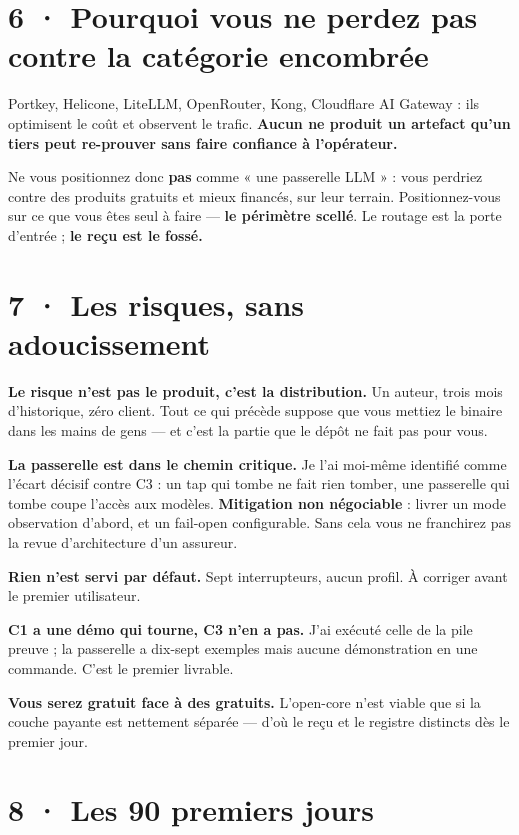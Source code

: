 \documentclass[10pt]{article}
\begin{document}
\section{6 · Pourquoi vous ne perdez pas contre la catégorie encombrée}

Portkey, Helicone, LiteLLM, OpenRouter, Kong, Cloudflare AI Gateway : ils optimisent le coût et
observent le trafic. \textbf{Aucun ne produit un artefact qu'un tiers peut re-prouver sans faire
confiance à l'opérateur.}

\begin{alerte}
Ne vous positionnez donc \textbf{pas} comme « une passerelle LLM » : vous perdriez contre des produits
gratuits et mieux financés, sur leur terrain. Positionnez-vous sur ce que vous êtes seul à faire ---
\textbf{le périmètre scellé}. Le routage est la porte d'entrée ; \textbf{le reçu est le fossé.}
\end{alerte}

\section{7 · Les risques, sans adoucissement}

\textbf{Le risque n'est pas le produit, c'est la distribution.} Un auteur, trois mois d'historique,
zéro client. Tout ce qui précède suppose que vous mettiez le binaire dans les mains de gens --- et
c'est la partie que le dépôt ne fait pas pour vous.

\textbf{La passerelle est dans le chemin critique.} Je l'ai moi-même identifié comme l'écart décisif
contre C3 : un tap qui tombe ne fait rien tomber, une passerelle qui tombe coupe l'accès aux modèles.
\textbf{Mitigation non négociable} : livrer un mode observation d'abord, et un fail-open configurable.
Sans cela vous ne franchirez pas la revue d'architecture d'un assureur.

\textbf{Rien n'est servi par défaut.} Sept interrupteurs, aucun profil. À corriger avant le premier
utilisateur.

\textbf{C1 a une démo qui tourne, C3 n'en a pas.} J'ai exécuté celle de la pile preuve ; la passerelle
a dix-sept exemples mais aucune démonstration en une commande. C'est le premier livrable.

\textbf{Vous serez gratuit face à des gratuits.} L'open-core n'est viable que si la couche payante est
nettement séparée --- d'où le reçu et le registre distincts dès le premier jour.

\section{8 · Les 90 premiers jours}
\end{document}
